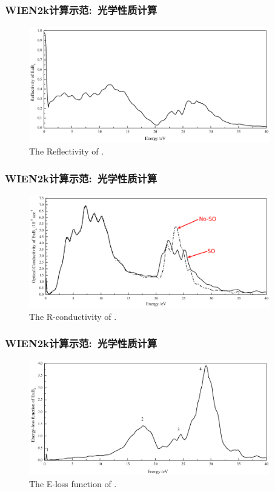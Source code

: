\frame
{
	\frametitle{\textrm{WIEN2k}计算示范:~光学性质计算}
\vspace*{-5pt}
\begin{figure}[h!]
\centering
\includegraphics[width=4.15in]{Figures/WIEN2k_EuB6-Reflect.png}
\caption{\tiny \textrm{The Reflectivity of .}}%
\label{Fig:WIEN2k_EuB6-Reflectivity}
\end{figure}
}

\frame
{
	\frametitle{\textrm{WIEN2k}计算示范:~光学性质计算}
\vspace*{-5pt}
\begin{figure}[h!]
\centering
\includegraphics[width=4.15in]{Figures/WIEN2k_EuB6-Conduct.png}
\caption{\tiny \textrm{The R-conductivity of .}}%
\label{Fig:WIEN2k_EuB6-conductivity}
\end{figure}
}

\frame
{
	\frametitle{\textrm{WIEN2k}计算示范:~光学性质计算}
\vspace*{-5pt}
\begin{figure}[h!]
\centering
\includegraphics[width=4.15in]{Figures/WIEN2k_EuB6-eloss.png}
\caption{\tiny \textrm{The E-loss function of .}}%
\label{Fig:WIEN2k_EuB6-eloss}
\end{figure}
}

